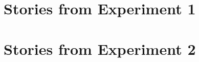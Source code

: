 \documentclass[12pt]{article}
\begin{document}


\appendix

\section{Stories from Experiment 1}
\label{sec:mater-exper-1}


\section{Stories from Experiment 2}
\label{sec:mater-exper-2}


\normalsize

\newpage

\listoffigures

\newpage 

\theendnotes
\end{document}
